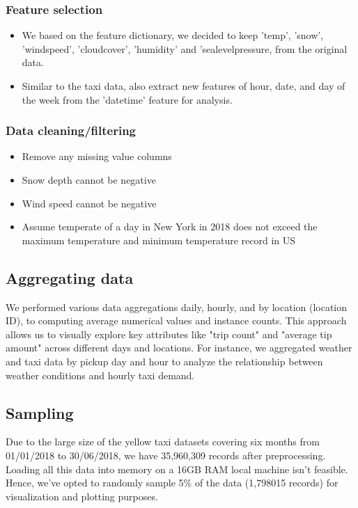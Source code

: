 \documentclass[11pt]{article}
\begin{document}
    \subsubsection{Feature selection}
        \begin{itemize}
            \item We based on the feature dictionary, we decided to keep 'temp', 'snow', 'windspeed', 'cloudcover', 'humidity' and 'sealevelpressure, from the original data. 

            \item Similar to the taxi data, also extract new features of hour, date, and day of the week from the 'datetime' feature for analysis. 
        \end{itemize}

    \subsubsection{Data cleaning/filtering}
        \begin{itemize}
            \item Remove any missing value columns
            \item Snow depth cannot be negative 
            \item Wind speed cannot be negative 
            \item Assume temperate of a day in New York in 2018 does not exceed the maximum temperature and minimum temperature record in US
        \end{itemize}


        
\subsection{Aggregating data}
We performed various data aggregations daily, hourly, and by location (location ID), to computing average numerical values and instance counts. This approach allows us to visually explore key attributes like "trip count" and "average tip amount" across different days and locations. For instance, we aggregated weather and taxi data by pickup day and hour to analyze the relationship between weather conditions and hourly taxi demand. 

\subsection{Sampling}
Due to the large size of the yellow taxi datasets covering six months from 01/01/2018 to 30/06/2018, we have 35,960,309 records after preprocessing. Loading all this data into memory on a 16GB RAM local machine isn't feasible. Hence, we've opted to randomly sample 5\% of the data (1,798015 records) for visualization and plotting purposes.
\end{document}
